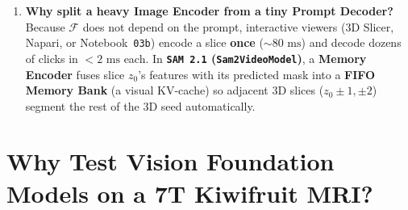 \documentclass[10.5pt,a4paper]{article}
\begin{document}
\begin{enumerate}
    \item \textbf{Why split a heavy Image Encoder from a tiny Prompt Decoder?} Because $\mathcal{F}$ does not depend on the prompt, interactive viewers (3D Slicer, Napari, or Notebook~\texttt{03b}) encode a slice \textbf{once} ($\sim 80\text{ ms}$) and decode dozens of clicks in $< 2\text{ ms}$ each. In \textbf{\texttt{SAM 2.1} (\texttt{Sam2VideoModel})}, a \textbf{Memory Encoder} fuses slice $z_0$'s features with its predicted mask into a \textbf{FIFO Memory Bank} (a visual KV-cache) so adjacent 3D slices ($z_0 \pm 1, \pm 2$) segment the rest of the 3D seed automatically.
\end{enumerate}

\section{Why Test Vision Foundation Models on a 7T Kiwifruit MRI?}
\end{document}
